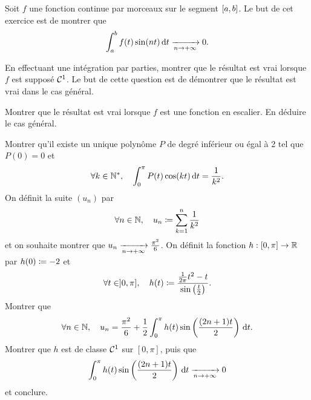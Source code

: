 \documentclass{magnolia}
\begin{document}
Soit $f$ une fonction continue par morceaux sur le segment $\left[a,b\right]$.
Le but de cet exercice est de montrer que
\[\int_{a}^{b} f(t)\sin(nt)\,\text{d}t \xrightarrow[n\rightarrow +\infty]{} 0.\]
\begin{questions}
\question En effectuant une intégration par parties, montrer que le résultat
  est vrai lorsque $f$ est supposé $\mathcal{C}^{1}$.
\question Le but de cette question est de démontrer que le résultat est vrai
  dans le cas général.
  \begin{questions}
  \question Montrer que le résultat est vrai lorsque $f$ est une fonction en
    escalier.
  \question En déduire le cas général.
  \end{questions}
\end{questions}

\begin{questions}
\question Montrer qu'il existe un unique polynôme $P$ de degré
  inférieur ou égal à 2 tel que $P(0)=0$ et
  \[\forall k\in{\mathbb{N}^*} ,\quad \int_{0}^{\pi} P(t)\cos(kt)\,\text{d}t=\frac{1}{k^2}.\]
\enonce On définit la suite $(u_n)$ par
  \[\forall n\in\mathbb{N},\quad u_n\coloneqq
    \sum_{k=1}^n \frac{1}{k^2}\]
  et on souhaite montrer que $u_n\xrightarrow[n\rightarrow +\infty]{} \frac{\pi^2}{6}$.
\question On définit la fonction $h:[0,\pi]\to\mathbb{R}$ par $h(0)\coloneqq -2$ et
  \[\forall t\in ]0,\pi],\quad
    h(t)\coloneqq
    \frac{\frac{1}{2\pi} t^2 - t}{\sin\left(\frac{t}{2}\right)}.\]
  Montrer que
  \[\forall n\in\mathbb{N},\quad u_n=\frac{\pi^2}{6}+\frac{1}{2}
    \int_{0}^{\pi} h(t)\sin\left(\frac{(2n+1)t}{2}\right)\,\text{d}t.\]
\question Montrer que $h$ est de classe $\mathcal{C}^{1}$ sur $[0,\pi]$, puis que
  \[\int_{0}^{\pi} h(t)\sin\left(\frac{(2n+1)t}{2}\right)\,\text{d}t\xrightarrow[n\rightarrow +\infty]{} 0\]
  et conclure.
\end{questions}
\end{document}
